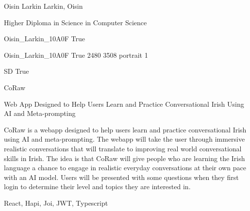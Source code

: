 
\begingroup{}\relax



\def\Key{Oisin_Larkin_10A0F}

{Oisin Larkin}
{Larkin, Oisin}

{Higher Diploma in Science in Computer Science}

{Oisin_Larkin_10A0F}
{True}

{Oisin_Larkin_10A0F}
{True}
{2480}
{3508}
{portrait}
{1}

{SD}
{True}

{CoRaw}

{Web App Designed to Help Users Learn and Practice Conversational Irish Using AI and Meta-prompting}

{CoRaw is a webapp designed to help users learn and practice conversational Irish using AI and meta-prompting. The webapp will take the user through immersive realistic conversations that will translate to improving real world conversational skills in Irish. The idea is that CoRaw will give people who are learning the Irish language a chance to engage in realistic everyday conversations at their own pace with an AI model. Users will be presented with some questions when they first login to determine their level and topics they are interested in.}

{React, Hapi, Joi, JWT, Typescript}


